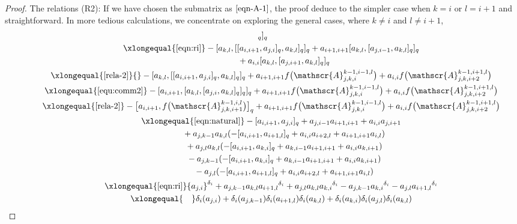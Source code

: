 \documentclass[pdftex]{sigma}
\numberwithin{equation}{section}
\def\d{\delta}
\def\A{\mathscr{A}}
\begin{document}
\begin{proof}
The relations (R2):
If we have chosen the submatrix \smash{$\A_{j,k,i+1}^{k-1,i,l}$} as $\eqref{eqn-A-1}$, the proof deduce to the simpler case when $k=i$ or $l=i+1$ and straightforward.
In more tedious calculations, we concentrate on exploring the general cases, where $k \neq i$ and $l \neq i+1$,
\begin{gather*}
 [\d_i (a_{k, l} ), [\d_i (a_{j, i} ),\d_i (a_{k, l} ) ]_q ]_q\\
\qquad \xlongequal{\eqref{eqn:ri}} - [ a_{k, l} , [ [a_{i, i+1}, a_{j, i} ]_q , a_{k, l} ]_q ]_q +a_{i+1, i+1} [ a_{k, l} , [a_{j, i-1} , a_{k, l} ]_q ]_q\\
 \qquad\qquad \quad{} +a_{i,i} [ a_{k, l} , [a_{j, i+1} , a_{k, l} ]_q ]_q\\
\qquad \xlongequal{\eqref{rela-2}} {}- [ a_{k, l} , [ [a_{i, i+1}, a_{j, i} ]_q , a_{k, l} ]_q ]_q +a_{i+1, i+1}f\bigl(\A_{j,k,i}^{k-1,i-1,l}\bigr)+a_{i,i}f\bigl(\A_{j,k,i+2}^{k-1,i+1,l}\bigr)\\
\qquad \xlongequal{\eqref{equ:comm2}} - [a_{i, i+1}, [a_{k, l}, [a_{j, i}, a_{k, l} ]_q ]_q ]_q +a_{i+1, i+1}f\bigl(\A_{j,k,i}^{k-1,i-1,l}\bigr) +a_{i,i}f\bigl(\A_{j,k,i+2}^{k-1,i+1,l}\bigr)\\
\qquad \xlongequal{\eqref{rela-2}} - \bigl[a_{i, i+1},f \bigl(\A_{j,k,i+1}^{k-1,i,l} \bigr) \bigr]_q +a_{i+1, i+1}f\bigl(\A_{j,k,i}^{k-1,i-1,l}\bigr) +a_{i,i}f \bigl(\A_{j,k,i+2}^{k-1,i+1,l} \bigr)\\
 \qquad\xlongequal{\eqref{eqn:natural}} - [a_{i, i+1}, a_{j, i} ]_q+a_{j, i-1}a_{i+1, i+1}+a_{i,i}a_{j, i+1} \\
 \qquad\qquad \quad {} +a_{j,k-1} a_{k, l} (- [a_{i, i+1}, a_{i+1, l} ]_q+a_{i,i}a_{i+2,l}+a_{i+1, i+1}a_{i, l} ) \\
 \qquad\qquad \quad{} + a_{j, l}a_{k, l} (- [a_{i, i+1}, a_{k,i} ]_q+a_{k, i-1}a_{i+1, i+1}+a_{i,i}a_{k, i+1} ) \\
 \qquad\qquad\quad{} -a_{j,k-1} (- [a_{i, i+1}, a_{k,i} ]_q+a_{k, i-1}a_{i+1, i+1}+a_{i,i}a_{k, i+1} )\\
 \qquad\qquad \quad{} -a_{j, l} (- [a_{i, i+1}, a_{i+1, l} ]_q+a_{i,i}a_{i+2,l}+a_{i+1, i+1}a_{i, l} ) \\
\qquad \xlongequal{\eqref{eqn:ri}} {a_{j, i}}^{\d_i} +a_{j,k-1}a_{k, l}{a_{i+1, l}}^{\d_i}+a_{j, l}a_{k,l} {a_{k,i}}^{\d_i}-a_{j,k-1}{a_{k,i}}^{\d_i} -a_{j, l}{a_{i+1, l}}^{\d_i}\\
 \qquad\xlongequal{\quad} \d_i (a_{j, i} ) +\d_i (a_{j,k-1} )\d_i (a_{i+1,l} ) \d_i (a_{k, l} )+\d_i (a_{k,i} )\d_i (a_{j, l} )\d_i (a_{k, l} ) \\

\end{gather*}
\end{proof}
\end{document}
